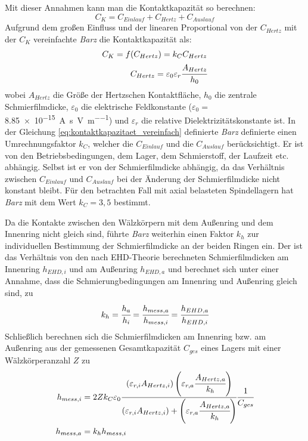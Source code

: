 Mit dieser Annahmen kann man die Kontaktkapazität so berechnen:
%
\begin{equation}
    C_K = C_{Einlauf} + C_{Hertz} + C_{Auslauf}
    \label{eq:kontaktkapazitaet}
\end{equation}
%
Aufgrund dem großen Einfluss und der linearen Proportional von der $C_{Hertz}$ mit der $C_K$ vereinfachte \textit{Barz} die Kontaktkapazität als:
%
\begin{align}
    C_K = f(C_{Hertz}) = k_C C_{Hertz} \\
    C_{Hertz} = \varepsilon_0 \varepsilon_r \cfrac{A_{Hertz}}{h_0}
    \label{eq:kontaktkapazitaet_vereinfach}
\end{align}
%
wobei $A_{Hertz}$ die Größe der Hertzschen Kontaktfläche, $h_0$ die zentrale Schmierfilmdicke, $\varepsilon_0$ die elektrische Feldkonstante ($\varepsilon_0 =$ \SI[bracket-unit-denominator=false, per-mode=symbol]{8,85e-15}{\ampere\second\per\volt\per\meter}) und $\varepsilon_r$ die relative Dielektrizitätskonstante ist.
In der Gleichung \ref{eq:kontaktkapazitaet_vereinfach} definierte \textit{Barz} definierte einen Umrechnungsfaktor $k_C$, welcher die $C_{Einlauf}$ und die $C_{Auslauf}$ berücksichtigt.
Er ist von den Betriebsbedingungen, dem Lager, dem Schmierstoff, der Laufzeit etc. abhängig.
Selbst ist er von der Schmierfilmdicke abhängig, da das Verhältnis zwischen $C_{Einlauf}$ und $C_{Auslauf}$ bei der Änderung der Schmierfilmdicke nicht konstant bleibt.
Für den betrachten Fall mit axial belasteten Spindellagern hat \textit{Barz} mit dem Wert $k_C = 3,5$ bestimmt.

Da die Kontakte zwischen den Wälzkörpern mit dem Außenring und dem Innenring nicht gleich sind, führte \textit{Barz} weiterhin einen Faktor $k_h$ zur individuellen Bestimmung der Schmierfilmdicke an der beiden Ringen ein.
Der ist das Verhältnis von den nach EHD-Theorie berechneten Schmierfilmdicken am Innenring $h_{EHD,i}$ und am Außenring $h_{EHD,a}$ und berechnet sich unter einer Annahme, dass die Schmierungbedingungen am Innenring und Außenring gleich sind, zu
%
\begin{equation}
    k_h = \cfrac{h_a}{h_i} = \cfrac{h_{mess,a}}{h_{mess,i}} = \cfrac{h_{EHD,a}}{h_{EHD,i}}
    \label{eq:kh_faktor}
\end{equation}
%
Schließlich berechnen sich die Schmierfilmdicken am Innenring bzw. am Außenring aus der gemessenen Gesamtkapazität $C_{ges}$ eines Lagers mit einer Wälzkörperanzahl $Z$ zu
%
\begin{align}
    h_{mess,i} &= 2 Z k_C \varepsilon_0 
                \cfrac{(\varepsilon_{r,i} A_{Hertz,i}) \left( \varepsilon_{r,a} \cfrac{A_{Hertz,a}}{k_h} \right) }
                      {(\varepsilon_{r,i} A_{Hertz,i}) + \left( \varepsilon_{r,a} \cfrac{A_{Hertz,a}}{k_h} \right) }
                \cfrac{1}{C_{ges}} \\
    h_{mess,a} &= k_h h_{mess,i}
\end{align}
%


